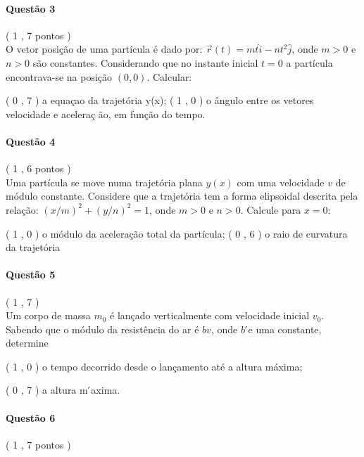 \documentclass[12pt,a4paper]{article}
\begin{document}
\newpage

\paragraph{Quest\~ao 3} ( 1 , 7 pontos )\\
\indent O vetor posi\c{c}\~ao de uma part\'icula \'e dado por: $\vec{r}(t) = mt\hat{i}-nt^2\hat{j}$, onde $m > 0$ e $n > 0$ s\~ao constantes. Considerando que no instante inicial $t = 0$ a part\'icula encontrava-se na posi\c{c}\~ao $(0,0)$. Calcular:

\begin{tasks}
\task ( 0 , 7 ) a equa\c{c}ao da trajet\'oria y(x);
\task ( 1 , 0 ) o \^angulo entre os vetores velocidade e acelera\c{c} \~ao, em fun\c{c}\~ao do tempo.
\end{tasks}

\paragraph{Quest\~ao 4} ( 1 , 6 pontos )\\
\indent Uma part\'icula se move numa trajet\'oria plana $y(x)$ com uma velocidade $v$ de m\'odulo constante. Considere que a trajet\'oria tem a forma elipsoidal descrita pela rela\c{c}\~ao: $(x/m)^2 + (y/n)^2 = 1$, onde $m > 0$ e $n > 0$. Calcule para $x = 0$:

\begin{tasks}
\task ( 1 , 0 ) o m\'odulo da acelera\c{c}\~ao total da part\'icula;
\task( 0 , 6 ) o raio de curvatura da trajet\'oria
\end{tasks}

\paragraph{Quest\~ao 5} ( 1 , 7 )\\
\indent Um corpo de massa $m_0$ \'e lan\c{c}ado verticalmente com velocidade inicial $v_0$. Sabendo que o m\'odulo da resist\^encia do ar \'e $bv$, onde $b$ ́e uma constante, determine

\begin{tasks}

\task ( 1 , 0 ) o tempo decorrido desde o lan\c{c}amento at\'e a altura m\'axima;

\task ( 0 , 7 ) a altura m ́axima.

\end{tasks}

\paragraph{Quest\~ao 6} ( 1 , 7 pontos )
\end{document}
